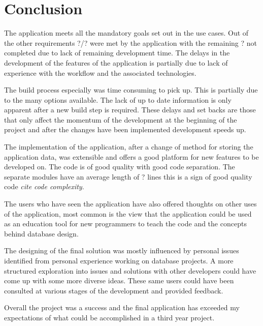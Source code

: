 \chapter{Conclusion}\label{conclusion}

The application meets all the mandatory goals set out in the use cases.
Out of the other requirements ?/? were met by the application with the
remaining ? not completed due to lack of remaining development time. The
delays in the development of the features of the application is
partially due to lack of experience with the workflow and the associated
technologies.

The build process especially was time consuming to pick up. This is
partially due to the many options available. The lack of up to date
information is only apparent after a new build step is required. These
delays and set backs are those that only affect the momentum of the
development at the beginning of the project and after the changes have
been implemented development speeds up.

The implementation of the application, after a change of method for
storing the application data, was extensible and offers a good platform
for new features to be developed on. The code is of good quality with
good code separation. The separate modules have an average length of ?
lines this is a sign of good quality code \emph{cite code complexity}.

The users who have seen the application have also offered thoughts on
other uses of the application, most common is the view that the
application could be used as an education tool for new programmers to
teach the code and the concepts behind database design.

The designing of the final solution was mostly influenced by personal
issues identified from personal experience working on database projects.
A more structured exploration into issues and solutions with other
developers could have come up with some more diverse ideas. These same
users could have been consulted at various stages of the development and
provided feedback.

Overall the project was a success and the final application has exceeded
my expectations of what could be accomplished in a third year project.
